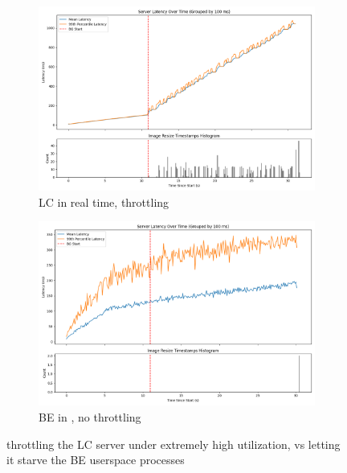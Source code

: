 \begin{figure}[t]
    \centering
    \begin{subfigure}[t]{0.49\columnwidth}
        \includegraphics[width=\columnwidth]{graphs/overload-rt.png}
        \caption{LC in real time, throttling}\label{fig:overload-rt}
    \end{subfigure}
    \hspace{\fill}
    \begin{subfigure}[t]{0.49\columnwidth}
        \includegraphics[width=\columnwidth]{graphs/overload-schedbe.png}
        \caption{BE in \schedbe{}, no throttling}\label{fig:overload-schedbe}
    \end{subfigure}
    \vspace{4pt}
    \caption{throttling the LC server under extremely high utilization, vs
    letting it starve the BE userspace processes}
\end{figure}


